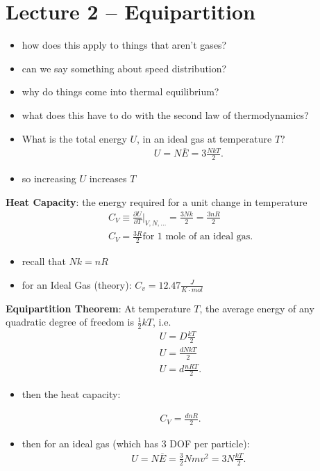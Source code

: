 \documentclass[10pt]{article}
\begin{document}
\section{Lecture 2 -- Equipartition}
\begin{itemize}
    \item how does this apply to things that aren't gases?
    \item can we say something about speed distribution?
    \item why do things come into thermal equilibrium?
    \item what does this have to do with the second law of thermodynamics?
\end{itemize}
\begin{itemize}
    \item What is the total energy $U$, in an ideal gas at temperature $T$?
    \begin{align*}
        U = N\overline{E} = 3 \frac{NkT}{2}
    .\end{align*}
\item so increasing $U$ increases $T$
\end{itemize}
\begin{definition}
    \textbf{Heat Capacity}: the energy required for a unit change in temperature
    \begin{align*}
        C_V \equiv \frac{\partial U}{\partial T} |_{V,N,\ldots} = \frac{3Nk}{2} = \frac{3nR}{2} \\ 
        C_V = \frac{3R}{2} \text{for 1 mole of an ideal gas}
    .\end{align*}
    \begin{itemize}
        \item recall that $Nk = nR$
        \item for an Ideal Gas (theory): $C_v = 12.47 \frac{J}{K \cdot mol}$
    \end{itemize}
\end{definition}

\begin{theorem}
    \textbf{Equipartition Theorem}: At temperature $T$, the average energy of any quadratic degree of freedom is $\frac{1}{2}kT$, i.e.
    \begin{gather*}
            U = D \frac{kT}{2} \\ 
            U = \frac{dNkT}{2} \\ 
            U = d \frac{nRT}{2}
    .\end{gather*}
    \begin{itemize}
        \item then the heat capacity:
    \end{itemize}
    \begin{gather*}
            C_V = \frac{dnR}{2}
    .\end{gather*}
    \begin{itemize}
        \item then for an ideal gas (which has 3 DOF per particle):
        \begin{gather}
            U = N\overline{E} = \frac{3}{2}Nmv^2 = 3N \frac{kT}{2}
        .\end{gather}
    \end{itemize}
\end{theorem}
\end{document}
